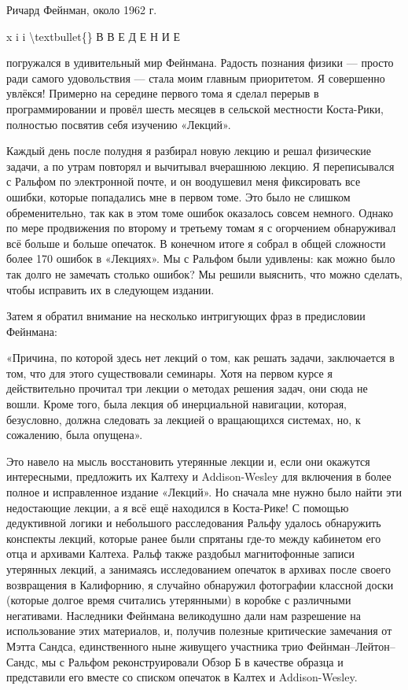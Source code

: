 \documentclass[10pt,oneside]{article}
\begin{document}
Ричард Фейнман, около 1962 г.\par

x i i \textbackslash{}textbullet\{\} В В Е Д Е Н И Е\par

погружался в удивительный мир Фейнмана. Радость познания физики --- просто ради самого удовольствия --- стала моим главным приоритетом. Я совершенно увлёкся! Примерно на середине первого тома я сделал перерыв в программировании и провёл шесть месяцев в сельской местности Коста-Рики, полностью посвятив себя изучению «Лекций».\par

Каждый день после полудня я разбирал новую лекцию и решал физические задачи, а по утрам повторял и вычитывал вчерашнюю лекцию. Я переписывался с Ральфом по электронной почте, и он воодушевил меня фиксировать все ошибки, которые попадались мне в первом томе. Это было не слишком обременительно, так как в этом томе ошибок оказалось совсем немного. Однако по мере продвижения по второму и третьему томам я с огорчением обнаруживал всё больше и больше опечаток. В конечном итоге я собрал в общей сложности более 170 ошибок в «Лекциях». Мы с Ральфом были удивлены: как можно было так долго не замечать столько ошибок? Мы решили выяснить, что можно сделать, чтобы исправить их в следующем издании.\par

Затем я обратил внимание на несколько интригующих фраз в предисловии Фейнмана:\par

«Причина, по которой здесь нет лекций о том, как решать задачи, заключается в том, что для этого существовали семинары. Хотя на первом курсе я действительно прочитал три лекции о методах решения задач, они сюда не вошли. Кроме того, была лекция об инерциальной навигации, которая, безусловно, должна следовать за лекцией о вращающихся системах, но, к сожалению, была опущена».\par

Это навело на мысль восстановить утерянные лекции и, если они окажутся интересными, предложить их Калтеху и Addison-Wesley для включения в более полное и исправленное издание «Лекций». Но сначала мне нужно было найти эти недостающие лекции, а я всё ещё находился в Коста-Рике! С помощью дедуктивной логики и небольшого расследования Ральфу удалось обнаружить конспекты лекций, которые ранее были спрятаны где-то между кабинетом его отца и архивами Калтеха. Ральф также раздобыл магнитофонные записи утерянных лекций, а занимаясь исследованием опечаток в архивах после своего возвращения в Калифорнию, я случайно обнаружил фотографии классной доски (которые долгое время считались утерянными) в коробке с различными негативами. Наследники Фейнмана великодушно дали нам разрешение на использование этих материалов, и, получив полезные критические замечания от Мэтта Сандса, единственного ныне живущего участника трио Фейнман–Лейтон–Сандс, мы с Ральфом реконструировали Обзор Б в качестве образца и представили его вместе со списком опечаток в Калтех и Addison-Wesley.\par
\end{document}
